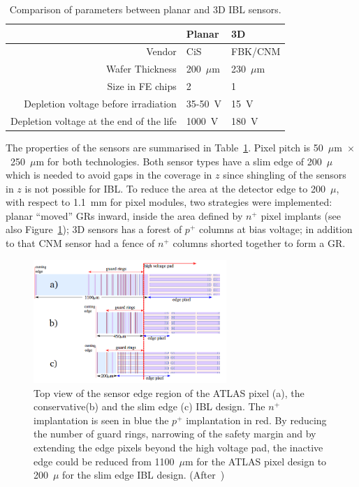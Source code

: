 \begin{table}[!htpb]
\caption{\label{tab:IBLsensors}Comparison of parameters between planar and 3D IBL sensors.}
\centering
\begin{tabular}{rll}
\hline
 & Planar & 3D\\
 \hline
 \hline
 Vendor & CiS & FBK/CNM \\
 Wafer Thickness & 200~$\mu$m & 230~$\mu$m \\
 Size in FE chips & 2 & 1\\
 Depletion voltage before irradiation & 35-50~V & 15~V \\
 Depletion voltage at the end of the life & 1000~V & 180~V\\
 \hline
 \end{tabular}
\end{table}
The properties of the sensors are summarised in Table~\ref{tab:IBLsensors}.
Pixel pitch is 50~$\mu$m~$\times$~250~$\mu$m for both technologies. 
Both sensor types have a slim edge of 200~$\mu$ which is needed to avoid gaps in the coverage in $z$ since shingling of the sensors in $z$ is not possible for IBL. 
To reduce the area at the detector edge to 200~$\mu$, with respect to 1.1~mm for pixel modules, 
two strategies were implemented: planar ``moved'' GRs inward, inside the area defined by $n^+$ 
pixel implants (see also Figure~\ref{fig:IBLSlimEdge});  3D sensors has a forest of $p^+$ columns 
at bias voltage; in addition to that CNM sensor had a fence of $n^+$ columns shorted together to form a GR.
\begin{figure}[!htpb]
\centering
\includegraphics[width=0.65\textwidth]{IBLSlimEdge.png}
\caption{\label{fig:IBLSlimEdge}Top view of the sensor edge region of the ATLAS pixel (a), the conservative(b) and the slim edge (c) IBL design. The $n^+$ implantation is seen in blue the $p^+$ implantation in red. By reducing the number of guard rings, narrowing of the safety margin and by extending the edge pixels beyond the high voltage pad, the inactive edge could be reduced from 1100~$\mu$m for the ATLAS pixel design to 200~$\mu$ for the slim edge IBL design. (After~\cite{WittigPHD})} 
\end{figure}

